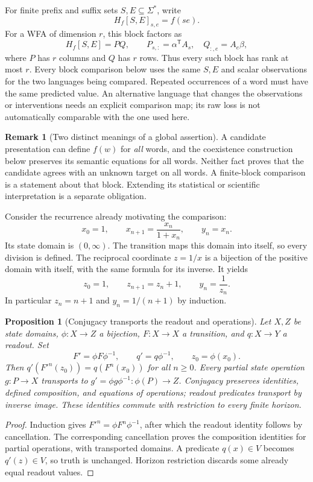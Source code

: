 \documentclass[11pt]{article}
\newtheorem{proposition}[theorem]{Proposition}
\theoremstyle{definition}
\newtheorem{remark}[theorem]{Remark}
\begin{document}
For finite prefix and suffix sets $S,E\subseteq\Sigma^*$, write
\[
 H_f[S,E]_{s,e}=f(se).
\]
For a WFA of dimension $r$, this block factors as
\[
 H_f[S,E]=P Q,\qquad
 P_{s,:}=\alpha^{\mathsf T}A_s,\quad Q_{:,e}=A_e\beta,
\]
where $P$ has $r$ columns and $Q$ has $r$ rows.
Thus every such block has rank at most $r$.
Every block comparison below uses the same $S,E$ and scalar observations
for the two languages being compared.
Repeated occurrences of a word must have the same predicted value.
An alternative language that changes the observations or interventions
needs an explicit comparison map; its raw loss is not automatically
comparable with the one used here.

\begin{remark}[Two distinct meanings of a global assertion]
A candidate presentation can define $f(w)$ for \emph{all} words, and the
coexistence construction below preserves its semantic equations for all
words. Neither fact proves that the candidate agrees with an unknown
target on all words. A finite-block comparison is a statement about that
block. Extending its statistical or scientific interpretation is a
separate obligation.
\end{remark}

Consider the recurrence already motivating the comparison:
\begin{equation}
\label{eq:cc-rational}
 x_0=1,\qquad x_{n+1}=\frac{x_n}{1+x_n},\qquad y_n=x_n.
\end{equation}
Its state domain is $(0,\infty)$. The transition maps this domain into itself,
so every division is defined. The reciprocal coordinate $z=1/x$ is a bijection
of the positive domain with itself, with the same formula for its inverse.
It yields
\begin{equation}
\label{eq:cc-affine}
 z_0=1,\qquad z_{n+1}=z_n+1,\qquad y_n=\frac1{z_n}.
\end{equation}
In particular $z_n=n+1$ and $y_n=1/(n+1)$ by induction.

\begin{proposition}[Conjugacy transports the readout and operations]
\label{prop:cc-conjugacy}
Let $X,Z$ be state domains, $\phi:X\to Z$ a bijection, $F:X\to X$ a
transition, and $q:X\to Y$ a readout. Set
\[
 F'=\phi F\phi^{-1},\qquad q'=q\phi^{-1},\qquad z_0=\phi(x_0).
\]
Then $q'(F'^n(z_0))=q(F^n(x_0))$ for all $n\ge0$. Every partial state
operation $g:P\to X$ transports to
$g'=\phi g\phi^{-1}:\phi(P)\to Z$. Conjugacy preserves identities,
defined composition, and equations of operations; readout predicates
transport by inverse image. These identities commute with restriction to
every finite horizon.
\end{proposition}
\begin{proof}
Induction gives $F'^n=\phi F^n\phi^{-1}$, after which the readout identity
follows by cancellation. The corresponding cancellation proves the
composition identities for partial operations, with transported domains.
A predicate $q(x)\in V$ becomes $q'(z)\in V$, so truth is unchanged.
Horizon restriction discards some already equal readout values.
\end{proof}
\end{document}
